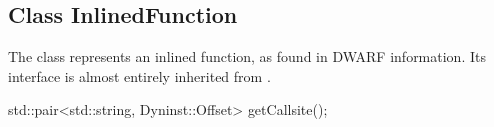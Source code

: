 \subsection{Class InlinedFunction}
\label{InlinedFunction}


The  class represents an inlined function, as found in DWARF information. Its interface is almost entirely inherited from .

\begin{apient}
std::pair<std::string, Dyninst::Offset> getCallsite();
\end{apient}
